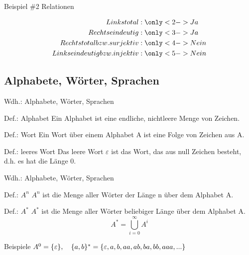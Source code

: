 \begin{frame}{Beispiel \#2 Relationen}
\begin{minipage}{0.5\textwidth}
\end{minipage} \hfill
	\begin{minipage}{0.45\textwidth}
		\begin{align*}
		Linkstotal&: \only<2->{Ja} \\
		Rechtseindeutig&: \only<3->{Ja} \\
		Rechtstotal bzw. surjektiv&: \only<4->{Nein} \\
		Linkseindeutig bzw. injektiv&: \only<5->{Nein} \\
		\end{align*}
	\end{minipage}
\end{frame}
\subsection{Alphabete, Wörter, Sprachen}
\begin{frame}{Wdh.: Alphabete, Wörter, Sprachen}
	\begin{block}{Def.: Alphabet}
		Ein Alphabet ist eine endliche, nichtleere Menge von Zeichen.
	\end{block}
	\pause
	\begin{block}{Def.: Wort}
		Ein Wort über einem Alphabet A ist eine Folge von Zeichen aus A.
	\end{block}
	\pause
	\begin{block}{Def.: leeres Wort}
		Das leere Wort \(\varepsilon\) ist das Wort, das aus null Zeichen besteht, d.h. es hat die Länge 0.
	\end{block}
\end{frame}

\begin{frame}{Wdh.: Alphabete, Wörter, Sprachen}
	\begin{block}{Def.: \(A^{n}\)}
	\pause
		\textbf{\(A^{n}\)} ist die Menge aller Wörter der Länge n über dem Alphabet A.
	\end{block}
	\pause
	\begin{block}{Def.: \(A^{*}\)}
	\pause
		\textbf{\(A^{*}\)} ist die Menge aller Wörter beliebiger Länge über dem Alphabet A.		
		\[
			A^{*}= \bigcup_{i=0}^{\infty} A^{i}
		\]
	\end{block}
	\pause
	\begin{exampleblock}{Beispiele}
		\(A^{0}=\{ \varepsilon \}, \quad \{ a,b \}^{*} = \{ \varepsilon, a, b, aa, ab, ba, bb, aaa, ... \}\)
	\end{exampleblock}
\end{frame}

